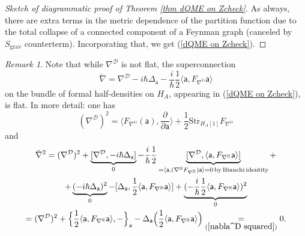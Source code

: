 \documentclass[11pt,a4paper]{amsart}
\theoremstyle{plain} %
\theoremstyle{definition}
\theoremstyle{remark}
\newtheorem{rem}[thm]{Remark}
\newcommand{\HH}{\mathbb{H}}
\newcommand{\mr}{\mathrm}
\newcommand{\sfa}{\mathsf{a}}
\newcommand{\mc}{\mathcal}
\begin{document}
{\begin{proof}[Sketch of diagrammatic proof of Theorem \ref{thm dQME on Zcheck}]
 As always, there are extra terms in the metric dependence of the partition function due to the total collapse of a connected component of a Feynman graph (canceled by $S_\mr{grav}$ counterterm). Incorporating that, we get (\ref{dQME on Zcheck}).
\end{proof}

\begin{rem}
    Note that while $\nabla^\mc{D}$ is not flat, the superconnection 
    \begin{equation}
    \check\nabla=\nabla^\mc{D}-i\hbar \Delta_\sfa -\frac{i}{\hbar} \frac12 \langle\sfa,F_{\nabla^\HH}\sfa \rangle
    \end{equation}
        on the bundle of formal half-densities on $H_A$, appearing in (\ref{dQME on Zcheck}), is flat. In more detail: one has
        \begin{equation}\label{nabla^D squared}
            (\nabla^\mc{D})^2=\langle F_{\nabla^\HH}(\sfa),\frac{\partial}{\partial\sfa} \rangle+\frac12 \mr{Str}_{H_A[1]} F_{\nabla^\HH}
        \end{equation}
        and
        \begin{multline}
            \check\nabla^2= (\nabla^\mc{D})^2 + \underbrace{[\nabla^\mc{D},-i\hbar\Delta_\sfa]}_0 - \frac{i}{\hbar} \frac12\underbrace{[\nabla^\mc{D}, \langle\sfa,F_{\nabla^\HH}\sfa \rangle]}_{=\langle \sfa, (\nabla^\HH F_{\nabla^\HH})\sfa\rangle=0 \,\mr{by\,Bianchi\, identity}}+\\
            +
            \underbrace{(-i\hbar \Delta_\sfa)^2}_0-[\Delta_\sfa,\frac12 \langle\sfa,F_{\nabla^\HH}\sfa \rangle]+\underbrace{(-\frac{i}{\hbar} \frac12 \langle\sfa,F_{\nabla^\HH}\sfa \rangle)^2}_0\\
            =
            (\nabla^\mc{D})^2+\Big\{\frac12 \langle\sfa,F_{\nabla^\HH}\sfa \rangle,-\Big\}_\sfa-\Delta_\sfa\Big(\frac12 \langle\sfa,F_{\nabla^\HH}\sfa \rangle\Big)\underset{(\ref{nabla^D squared})}{=}0.
        \end{multline}
\end{rem}

}
\end{document}
